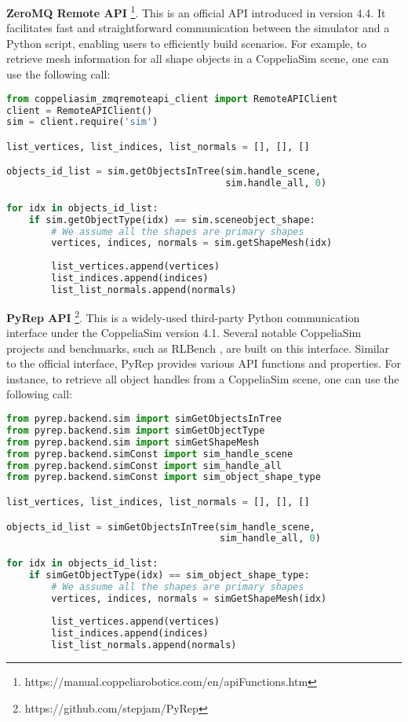 \textbf{ZeroMQ Remote API} \footnote{https://manual.coppeliarobotics.com/en/apiFunctions.htm}. This is an official API introduced in version 4.4. It facilitates fast and straightforward communication between the simulator and a Python script, enabling users to efficiently build scenarios. For example, to retrieve mesh information for all shape objects in a CoppeliaSim scene, one can use the following call:
\begin{lstlisting}[language=Python, caption=Example ZeroMQ Remote API.]
from coppeliasim_zmqremoteapi_client import RemoteAPIClient
client = RemoteAPIClient()
sim = client.require('sim')

list_vertices, list_indices, list_normals = [], [], []

objects_id_list = sim.getObjectsInTree(sim.handle_scene, 
                                       sim.handle_all, 0)

for idx in objects_id_list:
    if sim.getObjectType(idx) == sim.sceneobject_shape:
        # We assume all the shapes are primary shapes
        vertices, indices, normals = sim.getShapeMesh(idx)
        
        list_vertices.append(vertices)
        list_indices.append(indices)
        list_list_normals.append(normals)
\end{lstlisting}


\textbf{PyRep API}\cite{james2019pyrep} \footnote{https://github.com/stepjam/PyRep}. This is a widely-used third-party Python communication interface under the CoppeliaSim version 4.1. Several notable CoppeliaSim projects and benchmarks, such as RLBench \cite{james2020rlbench}, are built on this interface. Similar to the official interface, PyRep provides various API functions and properties. For instance, to retrieve all object handles from a CoppeliaSim scene, one can use the following call:
\begin{lstlisting}[language=Python, caption=Example PyRep API.]
from pyrep.backend.sim import simGetObjectsInTree
from pyrep.backend.sim import simGetObjectType
from pyrep.backend.sim import simGetShapeMesh
from pyrep.backend.simConst import sim_handle_scene
from pyrep.backend.simConst import sim_handle_all
from pyrep.backend.simConst import sim_object_shape_type

list_vertices, list_indices, list_normals = [], [], []

objects_id_list = simGetObjectsInTree(sim_handle_scene, 
                                      sim_handle_all, 0)

for idx in objects_id_list:
    if simGetObjectType(idx) == sim_object_shape_type:
        # We assume all the shapes are primary shapes
        vertices, indices, normals = simGetShapeMesh(idx)
        
        list_vertices.append(vertices)
        list_indices.append(indices)
        list_list_normals.append(normals)

\end{lstlisting}



